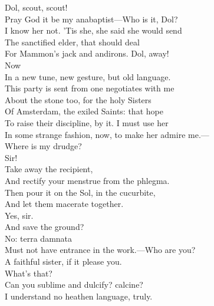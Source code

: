 \documentclass[a4paper,oneside,12pt]{memoir}
\begin{document}
\begin{drama*}
\subtlespeaks {} Dol, scout, scout!\\
Pray God it be my anabaptist---Who is it, Dol?\\
\dolspeaks I know her not.
\subtlespeaks {} 'Tis she, she said she would send\\
The sanctified elder, that should deal\\
For Mammon's jack and andirons. Dol, away!\\
 Now\\
In a new tune, new gesture, but old language.\\
This party is sent from one negotiates with me\\
About the stone too, for the holy Sisters\\
Of Amsterdam, the exiled Saints: that hope\\
To raise their discipline, by it. I must use her\\
In some strange fashion, now, to make her admire me.---\\
Where is my drudge?\\
\facespeaks {} Sir!\\
\subtlespeaks {} Take away the recipient,\\
And rectify your menstrue from the phlegma.\\
Then pour it on the Sol, in the cucurbite,\\
And let them macerate together.\\
\facespeaks {} Yes, sir.\\
And save the ground?\\
\subtlespeaks {} No: terra damnata\\
Must not have entrance in the work.---Who are you?\\
\persecutionspeaks A faithful sister, if it please you.\\
\subtlespeaks {} What's that?\\
Can you sublime and dulcify? calcine?\\
\persecutionspeaks I understand no heathen language, truly.\\

\end{drama*}
\end{document}
